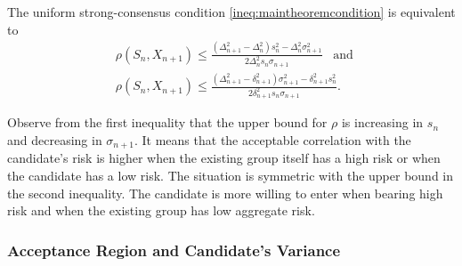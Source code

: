 \documentclass[fleqn,mnsc,nonblindrev]{informs4}
\begin{document}
\begin{corollary}\label{cor:correlation}
The uniform strong-consensus condition   {\eqref{ineq:maintheoremcondition}} is equivalent to
\begin{equation}\label{ineq:rho}
\begin{aligned}
&\rho(S_n,X_{n+1})\leq \frac{(\Delta_{n+1}^2-\Delta_n^2)s_{n}^2-\Delta_n^2\sigma_{n+1}^2}{2\Delta_n^2s_{n}\sigma_{n+1}}\,\,\,\text{ and }\\
&\rho(S_n,X_{n+1})\leq \frac{(\Delta_{n+1}^2-\delta_{n+1}^2)\sigma_{n+1}^2-\delta_{n+1}^2s_{n}^2}{2\delta_{n+1}^2s_n\sigma_{n+1}}.
\end{aligned}
\end{equation}
\end{corollary}
Observe from the first inequality that the upper bound for $\rho$ is increasing in $s_n$ and decreasing in $\sigma_{n+1}$. It means that the acceptable correlation with the candidate's risk is higher when the existing group itself has a high risk or when the candidate has a low risk. The situation is symmetric with the upper bound in the second inequality. The candidate is more willing to enter when bearing high risk and when the existing group has low aggregate risk.  

\subsubsection*{Acceptance Region and Candidate's Variance}
\end{document}
